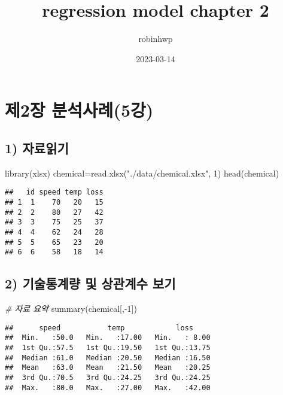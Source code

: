 \documentclass[
]{article}
\title{regression model chapter 2}
\author{robinhwp}
\date{2023-03-14}
\newenvironment{Shaded}{\begin{snugshade}}{\end{snugshade}}
\newcommand{\CommentTok}[1]{\textcolor[rgb]{0.56,0.35,0.01}{\textit{#1}}}
\newcommand{\DecValTok}[1]{\textcolor[rgb]{0.00,0.00,0.81}{#1}}
\newcommand{\FunctionTok}[1]{\textcolor[rgb]{0.00,0.00,0.00}{#1}}
\newcommand{\NormalTok}[1]{#1}
\newcommand{\OtherTok}[1]{\textcolor[rgb]{0.56,0.35,0.01}{#1}}
\newcommand{\SpecialCharTok}[1]{\textcolor[rgb]{0.00,0.00,0.00}{#1}}
\newcommand{\StringTok}[1]{\textcolor[rgb]{0.31,0.60,0.02}{#1}}
\begin{document}
\maketitle

\hypertarget{uxc81c2uxc7a5-uxbd84uxc11duxc0acuxb8405uxac15}{%
\section{제2장
분석사례(5강)}\label{uxc81c2uxc7a5-uxbd84uxc11duxc0acuxb8405uxac15}}

\hypertarget{uxc790uxb8ccuxc77duxae30}{%
\subsection{1) 자료읽기}\label{uxc790uxb8ccuxc77duxae30}}

\begin{Shaded}
\begin{Highlighting}[]
\FunctionTok{library}\NormalTok{(xlsx) }
\NormalTok{chemical}\OtherTok{=}\FunctionTok{read.xlsx}\NormalTok{(}\StringTok{"./data/chemical.xlsx"}\NormalTok{, }\DecValTok{1}\NormalTok{)}
\FunctionTok{head}\NormalTok{(chemical)}
\end{Highlighting}
\end{Shaded}

\begin{verbatim}
##   id speed temp loss
## 1  1    70   20   15
## 2  2    80   27   42
## 3  3    75   25   37
## 4  4    62   24   28
## 5  5    65   23   20
## 6  6    58   18   14
\end{verbatim}

\hypertarget{uxae30uxc220uxd1b5uxacc4uxb7c9-uxbc0f-uxc0c1uxad00uxacc4uxc218-uxbcf4uxae30}{%
\subsection{2) 기술통계량 및 상관계수
보기}\label{uxae30uxc220uxd1b5uxacc4uxb7c9-uxbc0f-uxc0c1uxad00uxacc4uxc218-uxbcf4uxae30}}

\begin{Shaded}
\begin{Highlighting}[]
\CommentTok{\# 자료 요약}
\FunctionTok{summary}\NormalTok{(chemical[,}\SpecialCharTok{{-}}\DecValTok{1}\NormalTok{]) }
\end{Highlighting}
\end{Shaded}

\begin{verbatim}
##      speed           temp            loss      
##  Min.   :50.0   Min.   :17.00   Min.   : 8.00  
##  1st Qu.:57.5   1st Qu.:19.50   1st Qu.:13.75  
##  Median :61.0   Median :20.50   Median :16.50  
##  Mean   :63.0   Mean   :21.50   Mean   :20.25  
##  3rd Qu.:70.5   3rd Qu.:24.25   3rd Qu.:24.25  
##  Max.   :80.0   Max.   :27.00   Max.   :42.00
\end{verbatim}
\end{document}

